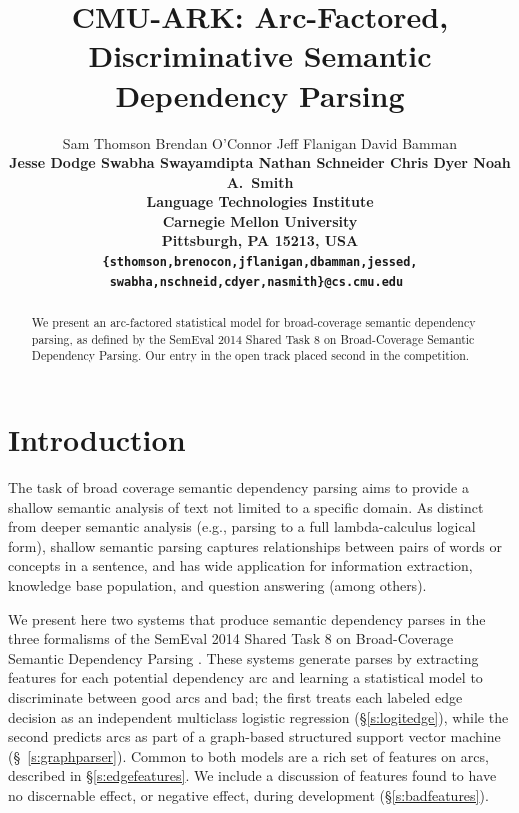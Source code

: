 \documentclass[11pt]{article}
\title{CMU-ARK: Arc-Factored, Discriminative Semantic Dependency Parsing}
\author{
	Sam Thomson \quad
	Brendan O'Connor \quad
	Jeff Flanigan \quad
	David Bamman \quad  \\
	\bf{Jesse Dodge \quad
	Swabha Swayamdipta \quad
	Nathan Schneider \quad
	Chris Dyer \quad
	Noah A.~Smith} \\
  Language Technologies Institute \\
  Carnegie Mellon University \\
  Pittsburgh, PA 15213, USA \\
  {\tt\{sthomson,brenocon,jflanigan,dbamman,jessed,}\\
   \tt{swabha,nschneid,cdyer,nasmith\}@cs.cmu.edu}
}
\date{}
\begin{document}
\maketitle

\begin{abstract}
We present an arc-factored statistical model for broad-coverage
semantic dependency parsing, as defined by the SemEval 2014 Shared
Task 8 on
Broad-Coverage Semantic Dependency Parsing.    Our entry in the open
track placed second in the competition.
\end{abstract}



\section{Introduction}

The task of broad coverage semantic dependency parsing aims to provide a
shallow semantic analysis of text not limited to a specific domain.
As distinct from deeper semantic analysis (e.g., parsing to a full
lambda-calculus logical form), shallow semantic parsing captures relationships
between pairs of words or concepts in a sentence, and has wide application for
information extraction, knowledge base population, and question answering (among others).

We present here two systems that produce semantic dependency parses in the three formalisms of the SemEval 2014 Shared Task 8 on Broad-Coverage Semantic Dependency
Parsing \cite{oepens_broad_2014}.  These systems generate parses by extracting
features for each potential dependency arc and learning a statistical model to
discriminate between good arcs and bad;
the first treats each labeled edge decision as an independent multiclass
logistic regression (\S\ref{s:logitedge}), while the second predicts arcs
as part of a graph-based structured support vector machine (\S~\ref{s:graphparser}).
Common to both models are a rich set of features on arcs, described in
\S\ref{s:edgefeatures}.  We include a discussion of features found to
have no discernable effect, or negative effect, during development (\S\ref{s:badfeatures}).
\end{document}
